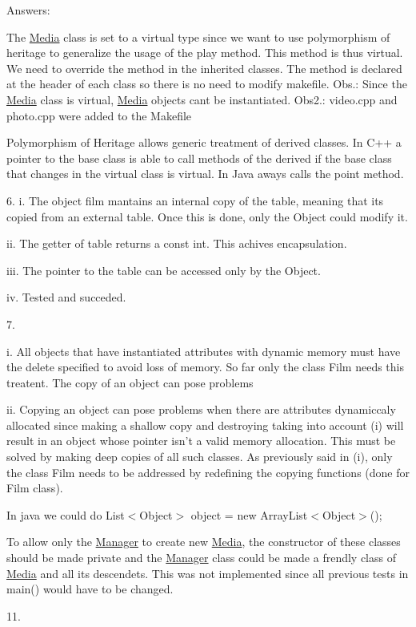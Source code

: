 Answers\+:


\begin{DoxyEnumerate}
\item The \mbox{\hyperlink{class_media}{Media}} class is set to a virtual type since we want to use polymorphism of heritage to generalize the usage of the play method. This method is thus virtual. We need to override the method in the inherited classes. The method is declared at the header of each class so there is no need to modify makefile. Obs.\+: Since the \mbox{\hyperlink{class_media}{Media}} class is virtual, \mbox{\hyperlink{class_media}{Media}} objects can\textquotesingle{}t be instantiated. Obs2.\+: video.\+cpp and photo.\+cpp were added to the Makefile
\item Polymorphism of Heritage allows generic treatment of derived classes. In C++ a pointer to the base class is able to call methods of the derived if the base class that changes in the virtual class is virtual. In Java aways calls the point method.
\end{DoxyEnumerate}

6. i. The object film mantains an internal copy of the table, meaning that it\textquotesingle{}s copied from an external table. Once this is done, only the Object could modify it.

ii. The getter of table returns a const int. This achives encapsulation.

iii. The pointer to the table can be accessed only by the Object.

iv. Tested and succeded.

7. \begin{DoxyVerb}i. All objects that have instantiated attributes with dynamic memory must have the delete specified to avoid loss of memory. So far only the class Film needs this treatent. The copy of an object can pose problems

ii. Copying an object can pose problems when there are attributes dynamiccaly allocated since making a shallow copy and destroying taking into account (i) will result in an object whose pointer isn't a valid memory allocation. This must be solved by making deep copies of all such classes. As previously said in (i), only the class Film needs to be addressed by redefining the copying functions (done for Film class).
\end{DoxyVerb}



\begin{DoxyEnumerate}
\item In java we could do List$<$\+Object$>$ object = new Array\+List$<$\+Object$>$();
\item To allow only the \mbox{\hyperlink{class_manager}{Manager}} to create new \mbox{\hyperlink{class_media}{Media}}, the constructor of these classes should be made private and the \mbox{\hyperlink{class_manager}{Manager}} class could be made a frendly class of \mbox{\hyperlink{class_media}{Media}} and all it\textquotesingle{}s descendets. This was not implemented since all previous tests in main() would have to be changed.
\end{DoxyEnumerate}

11. 